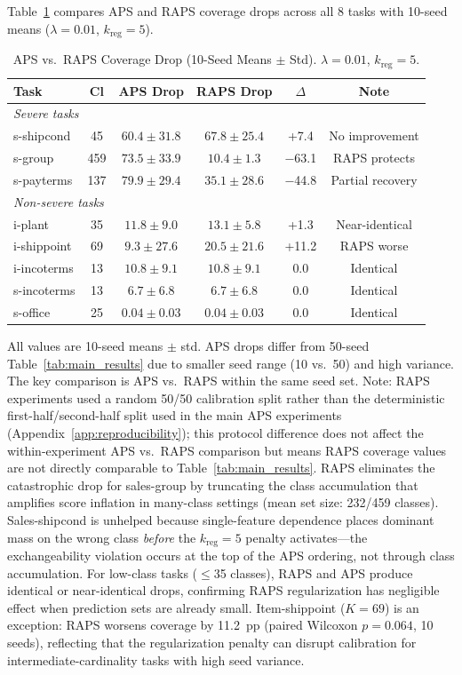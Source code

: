 \documentclass{uai2026} %
\begin{document}
Table~\ref{tab:raps} compares APS and RAPS coverage drops across all 8 tasks with 10-seed means ($\lambda=0.01$, $k_{\text{reg}}=5$).

\begin{table}[htbp]
\centering
\caption{APS vs.\ RAPS Coverage Drop (10-Seed Means $\pm$ Std). $\lambda=0.01$, $k_{\text{reg}}=5$.}\label{tab:raps}
\small
\begin{tabular}{@{}lccccc@{}}
\toprule
Task & Cl & APS Drop & RAPS Drop & $\Delta$ & Note \\
\midrule
\multicolumn{6}{l}{\textit{Severe tasks}} \\
s-shipcond & 45 & $60.4\pm31.8$ & $67.8\pm25.4$ & +7.4 & No improvement \\
s-group & 459 & $73.5\pm33.9$ & $10.4\pm1.3$ & $-$63.1 & RAPS protects \\
s-payterms & 137 & $79.9\pm29.4$ & $35.1\pm28.6$ & $-$44.8 & Partial recovery \\
\midrule
\multicolumn{6}{l}{\textit{Non-severe tasks}} \\
i-plant & 35 & $11.8\pm9.0$ & $13.1\pm5.8$ & +1.3 & Near-identical \\
i-shippoint & 69 & $9.3\pm27.6$ & $20.5\pm21.6$ & +11.2 & RAPS worse \\
i-incoterms & 13 & $10.8\pm9.1$ & $10.8\pm9.1$ & 0.0 & Identical \\
s-incoterms & 13 & $6.7\pm6.8$ & $6.7\pm6.8$ & 0.0 & Identical \\
s-office & 25 & $0.04\pm0.03$ & $0.04\pm0.03$ & 0.0 & Identical \\
\bottomrule
\end{tabular}


\raggedright
\footnotesize
All values are 10-seed means $\pm$ std. APS drops differ from 50-seed Table~\ref{tab:main_results} due to smaller seed range (10 vs.\ 50) and high variance. The key comparison is APS vs.\ RAPS within the same seed set. Note: RAPS experiments used a random 50/50 calibration split rather than the deterministic first-half/second-half split used in the main APS experiments (Appendix~\ref{app:reproducibility}); this protocol difference does not affect the within-experiment APS vs.\ RAPS comparison but means RAPS coverage values are not directly comparable to Table~\ref{tab:main_results}. RAPS eliminates the catastrophic drop for sales-group by truncating the class accumulation that amplifies score inflation in many-class settings (mean set size: 232/459 classes). Sales-shipcond is unhelped because single-feature dependence places dominant mass on the wrong class \textit{before} the $k_{\text{reg}}=5$ penalty activates---the exchangeability violation occurs at the top of the APS ordering, not through class accumulation. For low-class tasks ($\leq$35 classes), RAPS and APS produce identical or near-identical drops, confirming RAPS regularization has negligible effect when prediction sets are already small. Item-shippoint ($K=69$) is an exception: RAPS worsens coverage by 11.2~pp (paired Wilcoxon $p=0.064$, 10 seeds), reflecting that the regularization penalty can disrupt calibration for intermediate-cardinality tasks with high seed variance.
\end{table}
\end{document}
